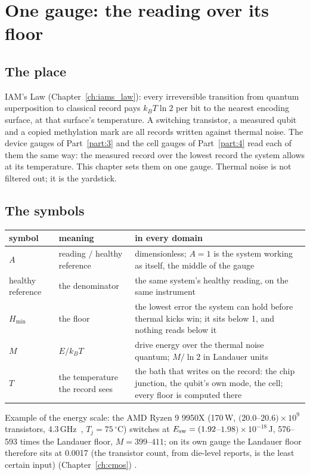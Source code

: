 \chapter{One gauge: the reading over its floor}\label{ch:onegauge}

\section*{The place}
IAM's Law (Chapter~\ref{ch:iams_law}): every irreversible transition from quantum superposition to classical record pays $k_BT\ln2$ per bit to
the nearest encoding surface, at that surface's temperature. A switching transistor, a measured qubit and a copied methylation mark are all
records written against thermal noise. The device gauges of Part~\ref{part:3} and the cell gauges of Part~\ref{part:4} read each of them the same
way: the measured record over the lowest record the system allows at its temperature. This chapter sets them on one gauge. Thermal noise is not
filtered out; it is the yardstick.

\section{The symbols}
\begin{center}\small\begin{tabular}{p{}p{}p{}}\toprule
symbol & meaning & in every domain\\\midrule
$A$ & reading $/$ healthy reference & dimensionless; $A=1$ is the system working as itself, the middle of the gauge\\
healthy reference & the denominator & the same system's healthy reading, on the same instrument\\
$H_{\min}$ & the floor & the lowest error the system can hold before thermal kicks win; it sits below 1, and nothing reads below it\\
$M$ & $E/k_BT$ & drive energy over the thermal noise quantum; $M/\ln2$ in Landauer units\\
$T$ & the temperature the record sees & the bath that writes on the record: the chip junction, the qubit's own mode, the cell; every floor is computed there\\\bottomrule
\end{tabular}\end{center}
Example of the energy scale: the AMD Ryzen 9 9950X (170\,W, $(20.0$--$20.6)\times10^9$ transistors, 4.3\,GHz~\cite{AMD9950X}, $T_j=75\,^\circ$C) switches at
$E_{\rm sw}=(1.92$--$1.98)\times10^{-18}$\,J, 576--593 times the Landauer floor, $M=399$--$411$; on its own gauge the Landauer floor therefore sits at 0.0017
(the transistor count, from die-level reports, is the least certain input)
(Chapter~\ref{ch:cmos}) \calc.

